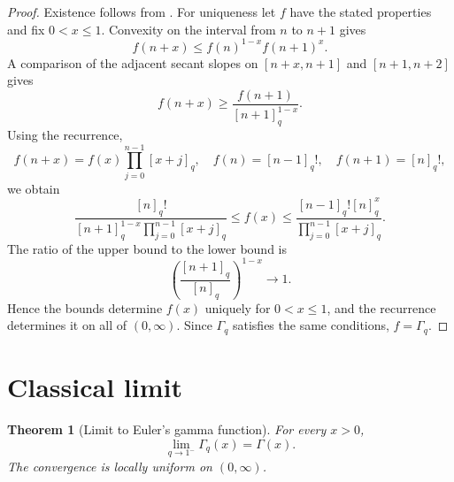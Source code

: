\documentclass[11pt,oneside,openany]{book}
\newtheorem{theorem}{Theorem}[chapter]
\theoremstyle{definition}
\theoremstyle{remark}
\begin{document}
\begin{proof}
Existence follows from .  For uniqueness let $f$ have the stated properties and fix $0<x\le1$.  Convexity on the interval from $n$ to $n+1$ gives
\[
 f(n+x)\le f(n)^{1-x}f(n+1)^x.
\]
A comparison of the adjacent secant slopes on $[n+x,n+1]$ and $[n+1,n+2]$ gives
\[
 f(n+x)\ge\frac{f(n+1)}{[n+1]_q^{1-x}}.
\]
Using the recurrence,
\[
 f(n+x)=f(x)\prod_{j=0}^{n-1}[x+j]_q,
 \quad
 f(n)=[n-1]_q!,
 \quad
 f(n+1)=[n]_q!,
\]
we obtain
\[
 \frac{[n]_q!}
 {[n+1]_q^{1-x}\prod_{j=0}^{n-1}[x+j]_q}
 \le f(x)\le
 \frac{[n-1]_q![n]_q^x}
 {\prod_{j=0}^{n-1}[x+j]_q}.
\]
The ratio of the upper bound to the lower bound is
\[
 \left(\frac{[n+1]_q}{[n]_q}\right)^{1-x}\longrightarrow1.
\]
Hence the bounds determine $f(x)$ uniquely for $0<x\le1$, and the recurrence determines it on all of $(0,\infty)$.  Since $\Gamma_q$ satisfies the same conditions, $f=\Gamma_q$.
\end{proof}

\section{Classical limit}

\begin{theorem}[Limit to Euler's gamma function]\label{thm:qgamma-classical-limit}
For every $x>0$,
\[
 \lim_{q\to1^-}\Gamma_q(x)=\Gamma(x).
\]
The convergence is locally uniform on $(0,\infty)$.
\end{theorem}
\end{document}
